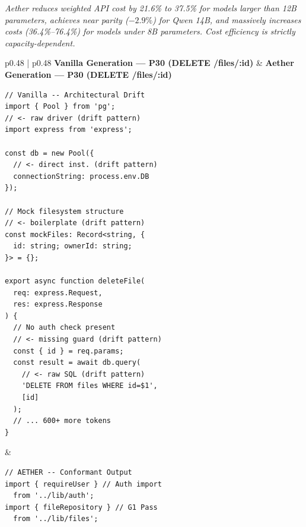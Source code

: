 \documentclass[review,12pt,3p]{elsarticle}
\begin{document}
\begin{tcolorbox}[
  colback=gray!10,
  colframe=black!60,
  title=\textbf{RQ3 Summary},
  fonttitle=\bfseries,
  breakable
]
\textit{Aether reduces weighted API cost by 21.6\% to 37.5\% for models larger than 12B parameters, 
achieves near parity ($-2.9\%$) for Qwen 14B, and massively increases costs (36.4\%--76.4\%) for models 
under 8B parameters. Cost efficiency is strictly capacity-dependent.}
\end{tcolorbox}

\begin{table}[htbp]
\centering
\caption{Side-by-side comparison of generated implementations for prompt P30 (DELETE /files/:id), demonstrating qualitative architectural drift patterns in Vanilla vs. target conformance in Aether.}
\label{tab:code_example}
\begin{tabular}{p{} | p{}}
\toprule
\textbf{Vanilla Generation --- P30 (DELETE /files/:id)} & \textbf{Aether Generation --- P30 (DELETE /files/:id)} \\
\midrule
\begin{minipage}[t]{0.48\textwidth}
\scriptsize
\begin{verbatim}
// Vanilla -- Architectural Drift
import { Pool } from 'pg';
// <- raw driver (drift pattern)
import express from 'express';

const db = new Pool({
  // <- direct inst. (drift pattern)
  connectionString: process.env.DB
});

// Mock filesystem structure
// <- boilerplate (drift pattern)
const mockFiles: Record<string, {
  id: string; ownerId: string;
}> = {};

export async function deleteFile(
  req: express.Request,
  res: express.Response
) {
  // No auth check present
  // <- missing guard (drift pattern)
  const { id } = req.params;
  const result = await db.query(
    // <- raw SQL (drift pattern)
    'DELETE FROM files WHERE id=$1',
    [id]
  );
  // ... 600+ more tokens
}
\end{verbatim}
\end{minipage}
&
\begin{minipage}[t]{0.48\textwidth}
\scriptsize
\begin{verbatim}
// AETHER -- Conformant Output
import { requireUser } // Auth import
  from '../lib/auth';
import { fileRepository } // G1 Pass
  from '../lib/files';


\end{verbatim}
\end{minipage}
\end{tabular}
\end{table}
\end{document}
